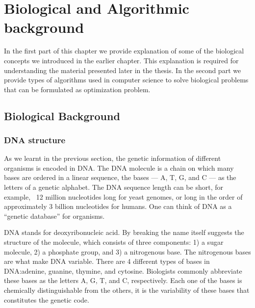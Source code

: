 \chapter{Biological and Algorithmic background}

In the first part of this chapter we provide explanation of some of the biological concepts we introduced in the earlier chapter. This explanation is required for understanding the material presented later in the thesis.
In the second part we provide types of algorithms used in computer science to solve biological problems that can be formulated as optimization problem.
\section{Biological Background}
\subsection{DNA structure}
As we learnt in the previous section, the genetic information of different organisms is encoded in DNA.
The DNA molecule is a chain on which many bases are ordered in a linear sequence, the bases --- A, T, G, and C --- as the letters of a genetic alphabet.
The DNA sequence length can be short, for example, ~12 million nucleotides long for yeast genomes, or long in the order of approximately 3 billion nucleotides for humans.
One can think of DNA as a “genetic database” for organisms.

DNA stands for deoxyribonucleic acid. 
By breaking the name itself suggests the structure of the molecule, which consists of three components: 1) a sugar molecule, 2) a phosphate group, and 3) a nitrogenous base.
The nitrogenous bases are what make DNA variable. 
There are 4 different types of bases in DNA:adenine, guanine, thymine, and cytosine. 
Biologists commonly abbreviate these bases as the letters A, G, T, and C, respectively. 
Each one of the bases is chemically distinguishable from the others, it is the variability of these bases that constitutes the genetic code.

